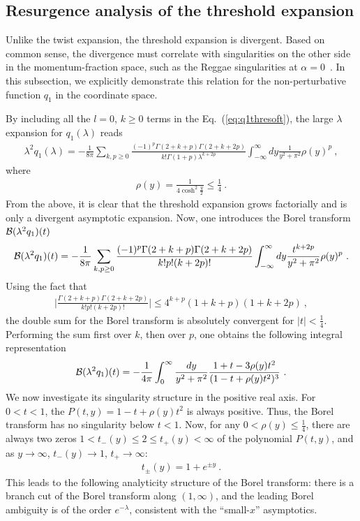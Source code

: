 \documentclass[a4paper,11pt]{article}
\begin{document}
\subsection{Resurgence analysis of the threshold expansion}
Unlike the twist expansion, the threshold expansion is divergent. Based on common sense, the divergence must correlate with singularities on the other side in the momentum-fraction space, such as the Reggae singularities at $\alpha=0$~\cite{Basso:2006nk}. In this subsection, we explicitly demonstrate this relation for the non-perturbative function $q_1$ in the coordinate space. 

By including all the $l=0$, $k \ge 0$ terms in the Eq.~(\ref{eq:q1thresoft}), the large $\lambda$ expansion for $q_1(\lambda)$ reads
\begin{align}
\lambda^2q_1(\lambda)=-\frac{1}{8\pi}\sum_{k,p \ge 0}\frac{(-1)^p\Gamma(2+k+p)\Gamma(2+k+2p)}{k!\Gamma(1+p)\lambda^{k+2p}}\int_{-\infty}^{\infty} dy \frac{1}{y^2+\pi^2}\rho(y)^p \ ,
\end{align}
where
\begin{align}
\rho(y)=\frac{1}{4\cosh^2 \frac{y}{2}} \le \frac{1}{4} \ .
\end{align}
From the above, it is clear that the threshold expansion grows factorially and is only a divergent asymptotic expansion. Now, one introduces the Borel transform ${\cal B}(\lambda^2q_1)(t)$
\begin{align}
{\cal B}(\lambda^2q_1)(t)=-\frac{1}{8\pi}\sum_{k,p \ge 0}\frac{(-1)^p\Gamma(2+k+p)\Gamma(2+k+2p)}{k!p!(k+2p)!}\int_{-\infty}^{\infty} dy \frac{t^{k+2p}}{y^2+\pi^2}\rho(y)^p \ .
\end{align}
Using the fact that 
\begin{align}
\bigg|\frac{\Gamma(2+k+p)\Gamma(2+k+2p)}{k!p!(k+2p)!}\bigg|\le 4^{k+p}(1+k+p)(1+k+2p) \ , 
\end{align}
the double sum for the Borel transform is absolutely convergent for $|t|<\frac{1}{4}$. 
Performing the sum first over $k$, then over $p$, one obtains the following integral representation
\begin{align}
{\cal B}(\lambda^2q_1)(t)=-\frac{1}{4\pi}\int_{0}^{\infty} \frac{dy}{y^2+\pi^2}\frac{1+t-3\rho(y)t^2}{(1-t+\rho(y)t^2)^3} \ . 
\end{align}
We now investigate its singularity structure in the positive real axis. For $0<t<1$, the $P(t,y)=1-t+\rho(y)t^2$ is always positive. Thus, the Borel transform has no singularity below $t<1$. Now, for any $0<\rho(y)\le \frac{1}{4}$, there are always two zeros $1<t_-(y)\le 2 \le t_+(y)<\infty$ of the polynomial $P(t,y)$, and as $y\rightarrow \infty$, $t_-(y)\rightarrow 1$, $t_+\rightarrow \infty$:
\begin{align}
t_{\pm }(y)=1+e^{ \pm y} \ .
\end{align}
This leads to the following analyticity structure of the Borel transform: there is a branch cut of the Borel transform along $(1,\infty)$, and the leading Borel ambiguity is of the order $e^{-\lambda}$, consistent with the ``small-$x$'' asymptotics.
\end{document}
